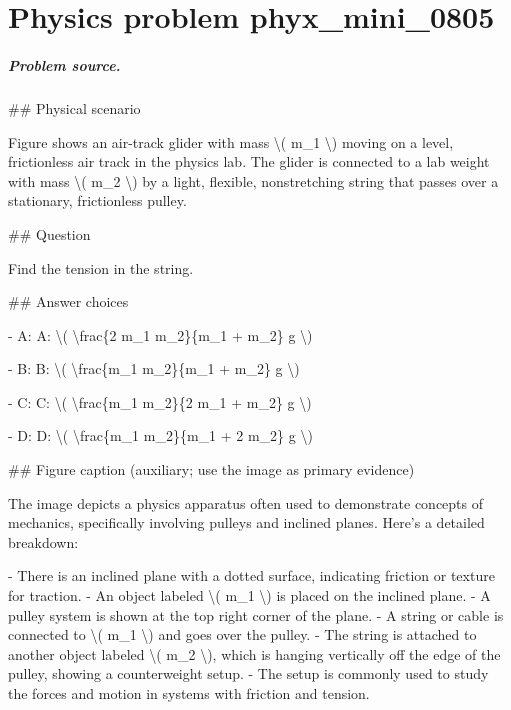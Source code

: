 
\chapter{Physics problem phyx\_mini\_0805}
\label{ch:PhyXMiniProblems_problem_phyx_mini_0805}

\paragraph{Problem source.}
\#\# Physical scenario

Figure shows an air-track glider with mass \textbackslash{}( m\_1 \textbackslash{}) moving on a level, frictionless air track in the physics lab. The glider is connected to a lab weight with mass \textbackslash{}( m\_2 \textbackslash{}) by a light, flexible, nonstretching string that passes over a stationary, frictionless pulley.

\#\# Question

Find the tension in the string.

\#\# Answer choices

- A: A: \textbackslash{}( \textbackslash{}frac\{2 m\_1 m\_2\}\{m\_1 + m\_2\} g \textbackslash{})

- B: B: \textbackslash{}( \textbackslash{}frac\{m\_1 m\_2\}\{m\_1 + m\_2\} g \textbackslash{})

- C: C: \textbackslash{}( \textbackslash{}frac\{m\_1 m\_2\}\{2 m\_1 + m\_2\} g \textbackslash{})

- D: D: \textbackslash{}( \textbackslash{}frac\{m\_1 m\_2\}\{m\_1 + 2 m\_2\} g \textbackslash{})

\#\# Figure caption (auxiliary; use the image as primary evidence)

The image depicts a physics apparatus often used to demonstrate concepts of mechanics, specifically involving pulleys and inclined planes. Here's a detailed breakdown:

- There is an inclined plane with a dotted surface, indicating friction or texture for traction.
- An object labeled \textbackslash{}( m\_1 \textbackslash{}) is placed on the inclined plane.
- A pulley system is shown at the top right corner of the plane.
- A string or cable is connected to \textbackslash{}( m\_1 \textbackslash{}) and goes over the pulley.
- The string is attached to another object labeled \textbackslash{}( m\_2 \textbackslash{}), which is hanging vertically off the edge of the pulley, showing a counterweight setup.
- The setup is commonly used to study the forces and motion in systems with friction and tension.

